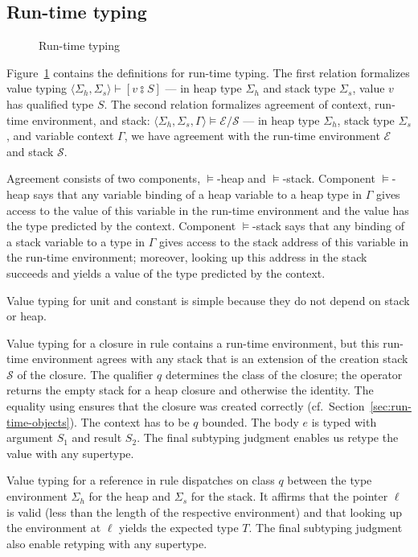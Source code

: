 \documentclass[sigplan,review,dvipsnames,screen,10pt]{acmart}
\begin{document}
\subsection{Run-time typing}
\label{sec:run-time-typing}
\begin{figure}[tp]
  \ValueTyping
  \caption{Run-time typing}
  \label{fig:run-time-typing}
\end{figure}

Figure~\ref{fig:run-time-typing} contains the definitions for run-time
typing. The first relation formalizes value typing $\langle \Sigma_h,
\Sigma_s \rangle\vdash{[ v \typecolon S]}$ --- in heap type $\Sigma_h$
and stack type $\Sigma_s$, value $v$ has qualified type $S$. The
second relation formalizes agreement of context, run-time environment,
and stack: $\langle \Sigma_h , \Sigma_s,
\Gamma\rangle\models\mathcal{E}/\mathcal{S}$ --- in heap type
$\Sigma_h$, stack type $\Sigma_s$, and variable context $\Gamma$, we
have agreement with the run-time environment $\mathcal{E}$ and stack
$\mathcal{S}$.

Agreement consists of two components, $\models$-heap and
$\models$-stack.
Component $\models$-heap says that any variable binding of a heap variable to a
heap type in $\Gamma$ gives access to the value of this variable in
the run-time environment and the value has the type predicted by the
context.
Component $\models$-stack says that any binding of a stack variable to a type in
$\Gamma$ gives access to the stack address of this variable in the
run-time environment; moreover, looking up this address in the stack
succeeds and yields a value of the type predicted by the context.

Value typing for unit and constant is simple because they do not
depend on stack or heap.

Value typing for a closure in rule {\ACTVClos} contains a run-time
environment, but this run-time environment agrees with any stack that
is an extension of the creation stack $\mathcal{S}$ of the
closure. The qualifier $q$ determines the class of the closure; the
 operator returns the empty stack for a heap closure
and otherwise the identity. The  equality using 
ensures that the closure was created correctly (cf.\ Section~\ref{sec:run-time-objects}).
The context has to be $q$ bounded.
The body $e$ is typed with argument $S_1$ and result $S_2$.
The final subtyping judgment enables us retype the value with any
supertype.

Value typing for a reference in rule {\ACTVRef} dispatches on class
$q$ between the type environment $\Sigma_h$ for the heap and
$\Sigma_s$ for the stack. It affirms that the pointer $\ell$ is valid
(less than the length of the respective environment) and that looking
up the environment at $\ell$ yields the expected type $T$.
The final subtyping judgment also enable retyping with any supertype.
\end{document}
